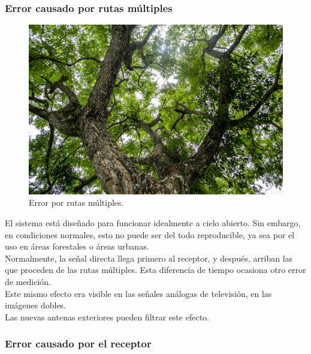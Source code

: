\subsubsection{Error causado por rutas múltiples}

\begin{figure}[!ht]
\centering
\includegraphics[scale=0.28]{Figures/RutasMult2}
\caption[Error por rutas múltiples.]{Error por rutas múltiples\footnotemark.}
\label{fig:ErrRMul}
\end{figure}


 El sistema está diseñado para funcionar idealmente a cielo abierto. Sin embargo, en condiciones normales, esto no puede ser del todo reproducible, ya sea por el uso en áreas forestales o áreas urbanas. \\
 
Normalmente, la señal directa llega primero al receptor, y después, arriban las que proceden de las rutas múltiples. Esta diferencia de tiempo ocasiona otro error de medición. \\

Este mismo efecto era visible en las señales análogas de televisión, en las imágenes dobles. \\

Las nuevas antenas exteriores pueden filtrar este efecto.

\subsubsection{Error causado por el receptor}

